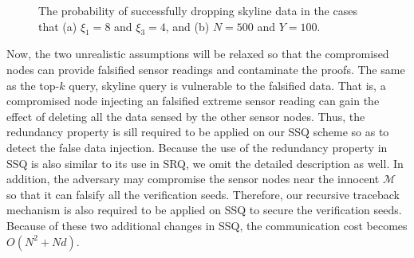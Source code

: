 \documentclass[conference]{IEEEtran}
\begin{document}
\begin{figure}[h]
\centering
{}
\caption{\scriptsize The probability of successfully dropping skyline data in the cases that (a) $\xi_1=8$ and $\xi_3=4$, and (b) $N=500$ and $Y=100$.} \label{fig: SSQimpact}
\end{figure}

Now, the two unrealistic assumptions will be relaxed so that the compromised nodes can provide falsified sensor readings and contaminate the proofs. The same as the top-$k$ query, skyline query is vulnerable to the falsified data. That is, a compromised node injecting an falsified extreme sensor reading can gain the effect of deleting all the data sensed by the other sensor nodes. Thus, the redundancy property is sill required to be applied on our SSQ scheme so as to detect the false data injection. Because the use of the redundancy property in SSQ is also similar to its use in SRQ, we omit the detailed description as well. In addition, the adversary may compromise the sensor nodes near the innocent $\mathcal{M}$ so that it can falsify all the verification seeds. Therefore, our recursive traceback mechanism is also required to be applied on SSQ to secure the verification seeds. Because of these two additional changes in SSQ, the communication cost becomes $O(N^2+Nd)$.
\end{document}
